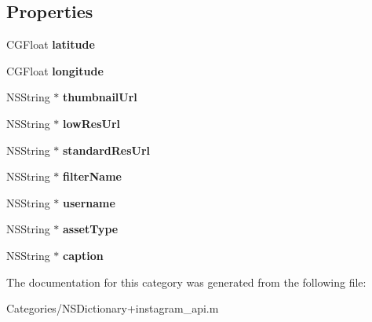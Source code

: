 \subsection*{Properties}
\begin{DoxyCompactItemize}
\item 
\hypertarget{category_n_s_dictionary_07_08_a4000d27a75ca9aa3c4e4d351c7caaf6c}{C\-G\-Float {\bfseries latitude}}\label{category_n_s_dictionary_07_08_a4000d27a75ca9aa3c4e4d351c7caaf6c}

\item 
\hypertarget{category_n_s_dictionary_07_08_a9cd11024eefdd8d5134f21f4928c86b1}{C\-G\-Float {\bfseries longitude}}\label{category_n_s_dictionary_07_08_a9cd11024eefdd8d5134f21f4928c86b1}

\item 
\hypertarget{category_n_s_dictionary_07_08_ae2d2617d600c2269dddce334fa791ebb}{N\-S\-String $\ast$ {\bfseries thumbnail\-Url}}\label{category_n_s_dictionary_07_08_ae2d2617d600c2269dddce334fa791ebb}

\item 
\hypertarget{category_n_s_dictionary_07_08_a25b14e8160b2dd82c5151eb004c679d6}{N\-S\-String $\ast$ {\bfseries low\-Res\-Url}}\label{category_n_s_dictionary_07_08_a25b14e8160b2dd82c5151eb004c679d6}

\item 
\hypertarget{category_n_s_dictionary_07_08_aa7db62c6f387f4552aeba7dd098c3fc6}{N\-S\-String $\ast$ {\bfseries standard\-Res\-Url}}\label{category_n_s_dictionary_07_08_aa7db62c6f387f4552aeba7dd098c3fc6}

\item 
\hypertarget{category_n_s_dictionary_07_08_a5c16eaa6a0a92cb6235411b8dd3c160f}{N\-S\-String $\ast$ {\bfseries filter\-Name}}\label{category_n_s_dictionary_07_08_a5c16eaa6a0a92cb6235411b8dd3c160f}

\item 
\hypertarget{category_n_s_dictionary_07_08_abcf14d09400c4d256ba1dfda3ec7bbe4}{N\-S\-String $\ast$ {\bfseries username}}\label{category_n_s_dictionary_07_08_abcf14d09400c4d256ba1dfda3ec7bbe4}

\item 
\hypertarget{category_n_s_dictionary_07_08_a9d1c878f3f6178123cc68d4029824d87}{N\-S\-String $\ast$ {\bfseries asset\-Type}}\label{category_n_s_dictionary_07_08_a9d1c878f3f6178123cc68d4029824d87}

\item 
\hypertarget{category_n_s_dictionary_07_08_a4e4e402713c90637625c57722c4c052c}{N\-S\-String $\ast$ {\bfseries caption}}\label{category_n_s_dictionary_07_08_a4e4e402713c90637625c57722c4c052c}

\end{DoxyCompactItemize}


The documentation for this category was generated from the following file\-:\begin{DoxyCompactItemize}
\item 
Categories/N\-S\-Dictionary+instagram\-\_\-api.\-m\end{DoxyCompactItemize}
